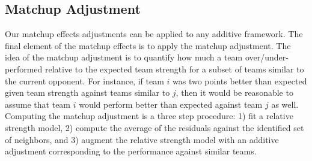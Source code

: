 \documentclass[letterpaper,12pt]{article}
\begin{document}
\subsection{Matchup Adjustment}
Our matchup effects adjustments can be applied to any additive framework. The final element of the matchup effects is to apply the matchup adjustment. The idea of the matchup adjustment is to quantify how much a team over/under-performed relative to the expected team strength for a subset of teams similar to the current opponent. For instance, if team $i$ was two points better than expected given team strength against teams similar to $j$, then it would be reasonable to assume that team $i$ would perform better than expected against team $j$ as well. Computing the matchup adjustment is a three step procedure: 1) fit a relative strength model, 2) compute the average of the residuals against the identified set of neighbors, and 3) augment the relative strength model with an additive adjustment corresponding to the performance against similar teams.
\end{document}
